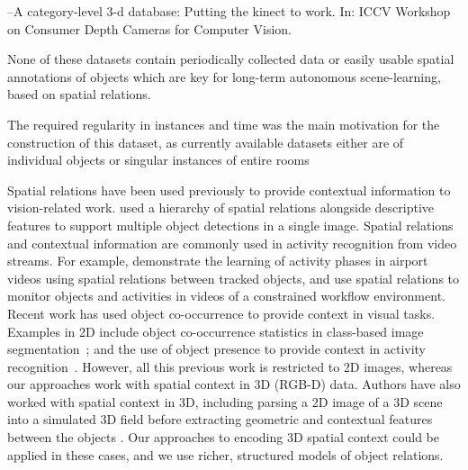 \documentclass[letterpaper, 10 pt, conference]{ieeeconf}  %
\begin{document}
--A category-level 3-d database: Putting the kinect to work. In: ICCV Workshop on
Consumer Depth Cameras for Computer Vision. 
 
 
 
None of these datasets contain periodically collected data or easily usable spatial annotations of objects which are key for long-term autonomous scene-learning, based on spatial relations.

The required regularity in instances and time was the main motivation for the construction of this dataset, as currently available datasets either are of individual objects or singular instances of entire rooms

Spatial relations have been used previously to provide contextual information to vision-related work. \cite{MyungJin:CVPR2010}used a hierarchy of spatial relations alongside descriptive features to support multiple object detections in a single image. Spatial relations and contextual information are commonly used in activity recognition from video streams. For example, \cite{Krishna:ECAI2010} demonstrate the learning of activity phases in airport videos using spatial relations between tracked objects, and \cite{Behera2012} use spatial relations to monitor objects and activities in videos of a constrained workflow environment. Recent work has used object co-occurrence to provide context in visual  tasks. Examples in 2D include object co-occurrence statistics in class-based image segmentation~\cite{Ladicky:IJCV2013}; and the use of object presence to provide context in activity recognition~\cite{Li:2012}. However, all this previous work is restricted to 2D images, whereas our approaches work with spatial context in 3D (RGB-D) data. Authors have also worked with spatial context in 3D, including parsing a 2D image of a 3D scene into a simulated 3D field before extracting geometric and contextual features between the objects \cite{Xiao:SIGGRAPH2012}. Our approaches to encoding 3D spatial context could be applied in these cases, and we use richer, structured models of object relations.
\end{document}
